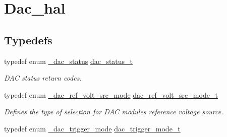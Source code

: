 \hypertarget{group__dac__hal}{}\section{Dac\+\_\+hal}
\label{group__dac__hal}
\subsection*{Typedefs}
\begin{DoxyCompactItemize}
\item 
typedef enum \hyperlink{group__dac__hal_gae46409393dc4005b88e984b043617361}{\+\_\+dac\+\_\+status} \hyperlink{group__dac__hal_gab9748a8b184e956f1a454a8351849fce}{dac\+\_\+status\+\_\+t}\hypertarget{group__dac__hal_gab9748a8b184e956f1a454a8351849fce}{}\label{group__dac__hal_gab9748a8b184e956f1a454a8351849fce}

\begin{DoxyCompactList}\small\item\em D\+AC status return codes. \end{DoxyCompactList}\item 
typedef enum \hyperlink{group__dac__hal_ga807e13039d861140e500b031aed7d958}{\+\_\+dac\+\_\+ref\+\_\+volt\+\_\+src\+\_\+mode} \hyperlink{group__dac__hal_gafb7036980fcc7a987015323662f6bd96}{dac\+\_\+ref\+\_\+volt\+\_\+src\+\_\+mode\+\_\+t}
\begin{DoxyCompactList}\small\item\em Defines the type of selection for D\+AC module\textquotesingle{}s reference voltage source. \end{DoxyCompactList}\item 
typedef enum \hyperlink{group__dac__hal_ga55c875a8ad0697b0220a2883303dc93a}{\+\_\+dac\+\_\+trigger\+\_\+mode} \hyperlink{group__dac__hal_gaf3cc0af58bcd8e40fd3d9b2651802e8c}{dac\+\_\+trigger\+\_\+mode\+\_\+t}\hypertarget{group__dac__hal_gaf3cc0af58bcd8e40fd3d9b2651802e8c}{}\label{group__dac__hal_gaf3cc0af58bcd8e40fd3d9b2651802e8c}


\end{DoxyCompactItemize}
